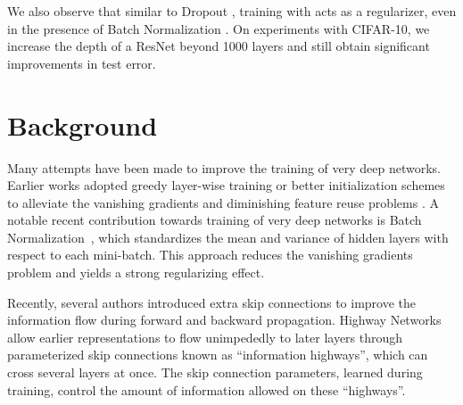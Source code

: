 \documentclass[runningheads]{llncs}
\begin{document}
We also observe that similar to Dropout \cite{srivastava2014dropout}, training with \name{} acts as a regularizer, even in the presence of Batch Normalization \cite{ioffe2015batch}. On experiments with CIFAR-10, we increase the depth of a ResNet beyond 1000 layers and still obtain significant improvements in test error.
 


\section{Background}

\label{sec_related}



Many attempts have been made to improve the training of very deep networks. Earlier works adopted greedy layer-wise training or better initialization schemes
to alleviate the vanishing gradients and diminishing feature reuse problems \cite{fahlman1989cascade,erhan2010does,glorot2010understanding}.
A notable recent contribution towards training of very deep networks is Batch Normalization~\cite{ioffe2015batch}, which standardizes the mean and variance of hidden layers with respect to each mini-batch. This approach reduces the vanishing gradients problem and yields a strong regularizing effect.

Recently, several authors introduced extra skip connections to improve the information flow during forward and backward propagation. Highway Networks \cite{srivastava2015highway} allow earlier representations to flow unimpededly to later layers through parameterized skip connections known as ``information highways'', which can cross several layers at once. The skip connection parameters, learned during training, control the amount of information allowed on these ``highways''.
\end{document}
